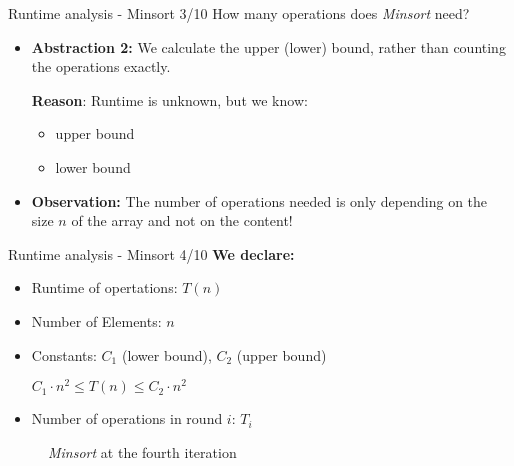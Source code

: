 \begin{frame}{Runtime analysis - Minsort 3/10}
  How many operations does \textit{Minsort} need?
  \begin{itemize}
    \item
      \textbf{Abstraction 2:} We calculate the upper (lower) bound,
      rather than counting the operations exactly.

      \textbf{Reason}: Runtime is unknown, but we know:
      \begin{itemize}
        \item {\color{Hell-Gruen}upper bound}
        \item {\color{Hell-Gruen}lower bound}
      \end{itemize}
    \item
      \textbf{Observation:} The number of operations needed is only
      depending on the size {\color{Mittel-Blau}$n$} of the array and not on the content!
  \end{itemize}
\end{frame}


\begin{frame}{Runtime analysis - Minsort 4/10}
  \textbf{We declare:}
  \begin{itemize}
    \item Runtime of opertations: $T(n)$
    \item Number of Elements: $n$
    \item Constants: $C_1$ ({\color{Hell-Gruen}lower bound}),
      $C_2$ ({\color{Hell-Gruen}upper bound})
    \begin{center}
      $C_{1} \cdot n^2
      \leq T(n)
      \leq C_{2} \cdot n^2$
    \end{center}
    \item Number of operations in round $i$: $T_i$
  \end{itemize}
  \begin{figure}[!h]
    \begin{adjustbox}{width=0.5\linewidth}
    \end{adjustbox}%
    \caption{\textit{Minsort} at the fourth iteration}%
    \label{fig:minsort_def}%
  \end{figure}
\end{frame}


